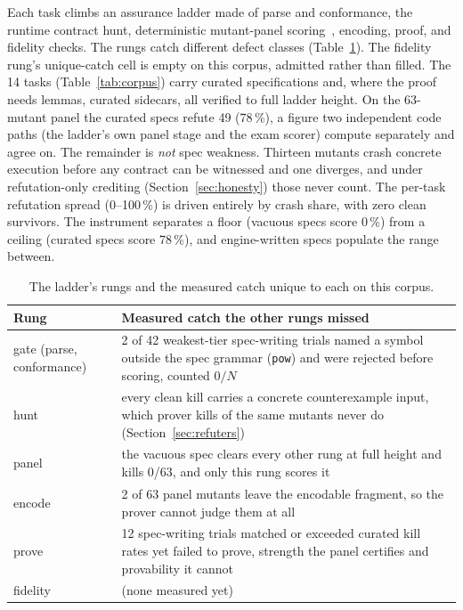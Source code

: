 \documentclass{article}
\begin{document}
Each task climbs an assurance ladder made of parse and conformance, the
runtime contract hunt, deterministic mutant-panel
scoring~\cite{papadakis}, encoding, proof, and fidelity checks. The rungs
catch different defect classes (Table~\ref{tab:rungs}). The fidelity
rung's unique-catch cell is empty on this corpus, admitted rather than
filled. The 14 tasks (Table~\ref{tab:corpus}) carry curated
specifications and, where the proof needs lemmas, curated sidecars, all
verified to full ladder height. On the 63-mutant panel the curated specs
refute 49 (78\,\%), a figure two independent code paths (the ladder's own
panel stage and the exam scorer) compute separately and agree on. The remainder is \emph{not} spec weakness.
Thirteen mutants crash concrete execution before any contract can be
witnessed and one diverges, and under refutation-only crediting
(Section~\ref{sec:honesty}) those never count. The per-task refutation
spread (0--100\,\%) is driven entirely by crash share, with zero clean
survivors. The instrument separates a floor (vacuous specs score 0\,\%)
from a ceiling (curated specs score 78\,\%), and engine-written specs
populate the range between.

\begin{table}[t]
\centering
\caption{The ladder's rungs and the measured catch unique to each on this
corpus.}
\label{tab:rungs}
\small
\begin{tabular}{lp{9.6cm}}
\toprule
Rung & Measured catch the other rungs missed \\
\midrule
gate (parse, conformance) & 2 of 42 weakest-tier spec-writing trials named
a symbol outside the spec grammar (\texttt{pow}) and were rejected before
scoring, counted $0/N$ \\
hunt & every clean kill carries a concrete counterexample input, which
prover kills of the same mutants never do (Section~\ref{sec:refuters}) \\
panel & the vacuous spec clears every other rung at full height and kills
0/63, and only this rung scores it \\
encode & 2 of 63 panel mutants leave the encodable fragment, so the prover
cannot judge them at all \\
prove & 12 spec-writing trials matched or exceeded curated kill rates yet
failed to prove, strength the panel certifies and provability it cannot \\
fidelity & (none measured yet) \\
\bottomrule
\end{tabular}
\end{table}
\end{document}
